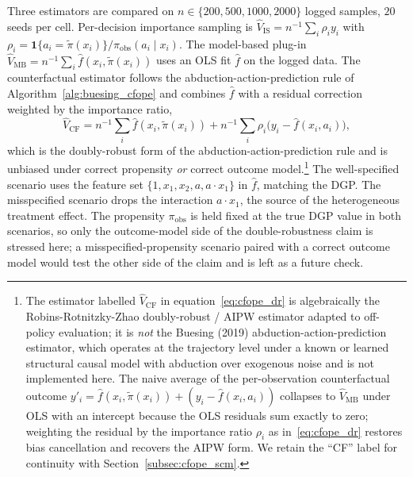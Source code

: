 Three estimators are compared on $n \in \{200, 500, 1000, 2000\}$ logged samples, $20$ seeds per cell. Per-decision importance sampling is $\widehat V_{\mathrm{IS}} = n^{-1} \sum_i \rho_i y_i$ with $\rho_i = \mathbf 1\{a_i = \widetilde\pi(x_i)\} / \pi_{\mathrm{obs}}(a_i \mid x_i)$. The model-based plug-in $\widehat V_{\mathrm{MB}} = n^{-1} \sum_i \hat f(x_i, \widetilde\pi(x_i))$ uses an OLS fit $\hat f$ on the logged data. The counterfactual estimator follows the abduction-action-prediction rule of Algorithm~\ref{alg:buesing_cfope} and combines $\hat f$ with a residual correction weighted by the importance ratio,
\begin{equation}
\widehat V_{\mathrm{CF}}
= n^{-1} \sum_i \hat f(x_i, \widetilde\pi(x_i))
  + n^{-1} \sum_i \rho_i \bigl(y_i - \hat f(x_i, a_i)\bigr),
\label{eq:cfope_dr}
\end{equation}
which is the doubly-robust form of the abduction-action-prediction rule and is unbiased under correct propensity \emph{or} correct outcome model.\footnote{The estimator labelled $\widehat V_{\mathrm{CF}}$ in equation~\eqref{eq:cfope_dr} is algebraically the Robins-Rotnitzky-Zhao doubly-robust / AIPW estimator adapted to off-policy evaluation; it is \emph{not} the Buesing (2019) abduction-action-prediction estimator, which operates at the trajectory level under a known or learned structural causal model with abduction over exogenous noise and is not implemented here. The naive average of the per-observation counterfactual outcome $y'_i = \hat f(x_i, \widetilde\pi(x_i)) + (y_i - \hat f(x_i, a_i))$ collapses to $\widehat V_{\mathrm{MB}}$ under OLS with an intercept because the OLS residuals sum exactly to zero; weighting the residual by the importance ratio $\rho_i$ as in~\eqref{eq:cfope_dr} restores bias cancellation and recovers the AIPW form. We retain the ``CF'' label for continuity with Section~\ref{subsec:cfope_scm}.} The well-specified scenario uses the feature set $\{1, x_1, x_2, a, a \cdot x_1\}$ in $\hat f$, matching the DGP. The misspecified scenario drops the interaction $a \cdot x_1$, the source of the heterogeneous treatment effect. The propensity $\pi_{\mathrm{obs}}$ is held fixed at the true DGP value in both scenarios, so only the outcome-model side of the double-robustness claim is stressed here; a misspecified-propensity scenario paired with a correct outcome model would test the other side of the claim and is left as a future check.

\begin{table}[h]
\centering
\caption{Counterfactual off-policy evaluation under a linear SCM, $n = 1000$, $20$ seeds.}
\label{tab:cfope_summary}

\end{table}

